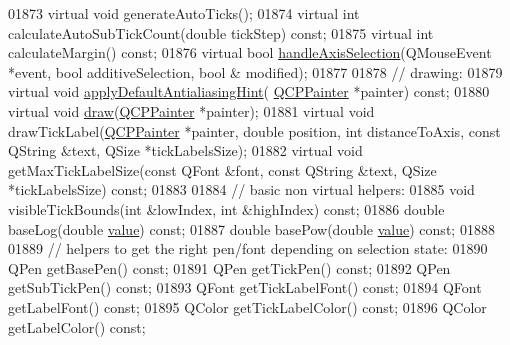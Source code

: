 \begin{DoxyCode}
01873   \textcolor{keyword}{virtual} \textcolor{keywordtype}{void} generateAutoTicks();
01874   \textcolor{keyword}{virtual} \textcolor{keywordtype}{int} calculateAutoSubTickCount(\textcolor{keywordtype}{double} tickStep) \textcolor{keyword}{const};
01875   \textcolor{keyword}{virtual} \textcolor{keywordtype}{int} calculateMargin() \textcolor{keyword}{const};
01876   \textcolor{keyword}{virtual} \textcolor{keywordtype}{bool} \hyperlink{a00116_a6085478fe8ba07b2a192cf8217133cb3}{handleAxisSelection}(QMouseEvent *event, \textcolor{keywordtype}{bool} additiveSelection, \textcolor{keywordtype}{bool} &
      modified);
01877   
01878   \textcolor{comment}{// drawing:}
01879   \textcolor{keyword}{virtual} \textcolor{keywordtype}{void} \hyperlink{a00044_afdf83ddc6a265cbf4c89fe99d3d93473}{applyDefaultAntialiasingHint}(
      \hyperlink{a00047}{QCPPainter} *painter) \textcolor{keyword}{const};
01880   \textcolor{keyword}{virtual} \textcolor{keywordtype}{void} \hyperlink{a00044_aecf2f7087482d4b6a78cb2770e5ed12d}{draw}(\hyperlink{a00047}{QCPPainter} *painter); 
01881   \textcolor{keyword}{virtual} \textcolor{keywordtype}{void} drawTickLabel(\hyperlink{a00047}{QCPPainter} *painter, \textcolor{keywordtype}{double} position, \textcolor{keywordtype}{int} distanceToAxis, \textcolor{keyword}{const} 
      QString &text, QSize *tickLabelsSize);
01882   \textcolor{keyword}{virtual} \textcolor{keywordtype}{void} getMaxTickLabelSize(\textcolor{keyword}{const} QFont &font, \textcolor{keyword}{const} QString &text, QSize *tickLabelsSize) \textcolor{keyword}{const};
01883   
01884   \textcolor{comment}{// basic non virtual helpers:}
01885   \textcolor{keywordtype}{void} visibleTickBounds(\textcolor{keywordtype}{int} &lowIndex, \textcolor{keywordtype}{int} &highIndex) \textcolor{keyword}{const};
01886   \textcolor{keywordtype}{double} baseLog(\textcolor{keywordtype}{double} \hyperlink{a00116_aee90379adb0307effb138f4871edbc5c}{value}) \textcolor{keyword}{const};
01887   \textcolor{keywordtype}{double} basePow(\textcolor{keywordtype}{double} \hyperlink{a00116_aee90379adb0307effb138f4871edbc5c}{value}) \textcolor{keyword}{const};
01888   
01889   \textcolor{comment}{// helpers to get the right pen/font depending on selection state:}
01890   QPen getBasePen() \textcolor{keyword}{const};
01891   QPen getTickPen() \textcolor{keyword}{const};
01892   QPen getSubTickPen() \textcolor{keyword}{const};
01893   QFont getTickLabelFont() \textcolor{keyword}{const};
01894   QFont getLabelFont() \textcolor{keyword}{const};
01895   QColor getTickLabelColor() \textcolor{keyword}{const};
01896   QColor getLabelColor() \textcolor{keyword}{const};

\end{DoxyCode}
